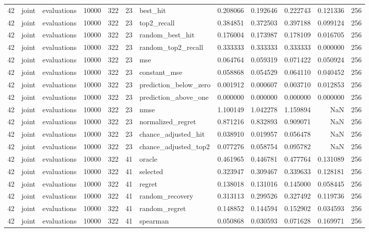 \begin{tabular}{rllrrrlrrrrr}
42 & joint & evaluations & 10000 & 322 & 23 & best_hit & 0.208066 & 0.192646 & 0.222743 & 0.121336 & 256 \\
42 & joint & evaluations & 10000 & 322 & 23 & top2_recall & 0.384851 & 0.372503 & 0.397188 & 0.099124 & 256 \\
42 & joint & evaluations & 10000 & 322 & 23 & random_best_hit & 0.176004 & 0.173987 & 0.178109 & 0.016705 & 256 \\
42 & joint & evaluations & 10000 & 322 & 23 & random_top2_recall & 0.333333 & 0.333333 & 0.333333 & 0.000000 & 256 \\
42 & joint & evaluations & 10000 & 322 & 23 & mse & 0.064764 & 0.059319 & 0.071422 & 0.050924 & 256 \\
42 & joint & evaluations & 10000 & 322 & 23 & constant_mse & 0.058868 & 0.054529 & 0.064110 & 0.040452 & 256 \\
42 & joint & evaluations & 10000 & 322 & 23 & prediction_below_zero & 0.001912 & 0.000607 & 0.003710 & 0.012853 & 256 \\
42 & joint & evaluations & 10000 & 322 & 23 & prediction_above_one & 0.000000 & 0.000000 & 0.000000 & 0.000000 & 256 \\
42 & joint & evaluations & 10000 & 322 & 23 & nmse & 1.100149 & 1.042278 & 1.159894 & NaN & 256 \\
42 & joint & evaluations & 10000 & 322 & 23 & normalized_regret & 0.871216 & 0.832893 & 0.909071 & NaN & 256 \\
42 & joint & evaluations & 10000 & 322 & 23 & chance_adjusted_hit & 0.038910 & 0.019957 & 0.056478 & NaN & 256 \\
42 & joint & evaluations & 10000 & 322 & 23 & chance_adjusted_top2 & 0.077276 & 0.058754 & 0.095782 & NaN & 256 \\
42 & joint & evaluations & 10000 & 322 & 41 & oracle & 0.461965 & 0.446781 & 0.477764 & 0.131089 & 256 \\
42 & joint & evaluations & 10000 & 322 & 41 & selected & 0.323947 & 0.309467 & 0.339633 & 0.128181 & 256 \\
42 & joint & evaluations & 10000 & 322 & 41 & regret & 0.138018 & 0.131016 & 0.145000 & 0.058445 & 256 \\
42 & joint & evaluations & 10000 & 322 & 41 & random_recovery & 0.313113 & 0.299526 & 0.327492 & 0.119736 & 256 \\
42 & joint & evaluations & 10000 & 322 & 41 & random_regret & 0.148852 & 0.144594 & 0.152902 & 0.034593 & 256 \\
42 & joint & evaluations & 10000 & 322 & 41 & spearman & 0.050868 & 0.030593 & 0.071628 & 0.169971 & 256 \\

\end{tabular}
